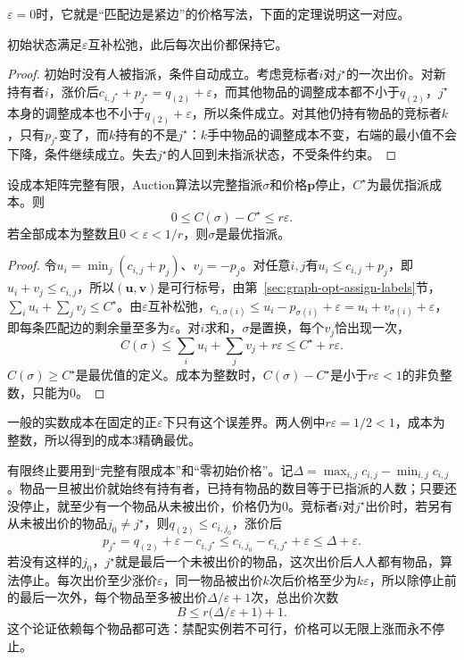 $\varepsilon=0$时，它就是“匹配边是紧边”的价格写法，下面的定理说明这一对应。

\begin{lemma}
初始状态满足$\varepsilon$互补松弛，此后每次出价都保持它。
\end{lemma}

\begin{proof}
初始时没有人被指派，条件自动成立。考虑竞标者$i$对$j^\star$的一次出价。对新持有者$i$，涨价后$c_{i,j^\star}+p_{j^\star}=q_{(2)}+\varepsilon$，而其他物品的调整成本都不小于$q_{(2)}$，$j^\star$本身的调整成本也不小于$q_{(2)}+\varepsilon$，所以条件成立。对其他仍持有物品的竞标者$k$，只有$p_{j^\star}$变了，而$k$持有的不是$j^\star$：$k$手中物品的调整成本不变，右端的最小值不会下降，条件继续成立。失去$j^\star$的人回到未指派状态，不受条件约束。
\end{proof}

\begin{theorem}[Auction算法的误差界]
\label{thm:graph-opt-auction}
设成本矩阵完整有限，Auction算法以完整指派$\sigma$和价格$\bm p$停止，$C^\star$为最优指派成本。则
\[
  0\leq C(\sigma)-C^\star\leq r\varepsilon.
\]
若全部成本为整数且$0<\varepsilon<1/r$，则$\sigma$是最优指派。
\end{theorem}

\begin{proof}
令$u_i=\min_j(c_{i,j}+p_j)$、$v_j=-p_j$。对任意$i,j$有$u_i\leq c_{i,j}+p_j$，即$u_i+v_j\leq c_{i,j}$，所以$(\bm u,\bm v)$是可行标号，由第~\ref{sec:graph-opt-assign-labels}节，$\sum_iu_i+\sum_jv_j\leq C^\star$。由$\varepsilon$互补松弛，$c_{i,\sigma(i)}\leq u_i-p_{\sigma(i)}+\varepsilon=u_i+v_{\sigma(i)}+\varepsilon$，即每条匹配边的剩余量至多为$\varepsilon$。对$i$求和，$\sigma$是置换，每个$v_j$恰出现一次，
\[
  C(\sigma)\leq\sum_iu_i+\sum_jv_j+r\varepsilon\leq C^\star+r\varepsilon.
\]
$C(\sigma)\geq C^\star$是最优值的定义。成本为整数时，$C(\sigma)-C^\star$是小于$r\varepsilon<1$的非负整数，只能为$0$。
\end{proof}

一般的实数成本在固定的正$\varepsilon$下只有这个误差界。两人例中$r\varepsilon=1/2<1$，成本为整数，所以得到的成本$3$精确最优。

有限终止要用到“完整有限成本”和“零初始价格”。记$\Delta=\max_{i,j}c_{i,j}-\min_{i,j}c_{i,j}$。物品一旦被出价就始终有持有者，已持有物品的数目等于已指派的人数；只要还没停止，就至少有一个物品从未被出价，价格仍为$0$。竞标者$i$对$j^\star$出价时，若另有从未被出价的物品$j_0\neq j^\star$，则$q_{(2)}\leq c_{i,j_0}$，涨价后
\[
  p_{j^\star}=q_{(2)}+\varepsilon-c_{i,j^\star}\leq c_{i,j_0}-c_{i,j^\star}+\varepsilon\leq\Delta+\varepsilon.
\]
若没有这样的$j_0$，$j^\star$就是最后一个未被出价的物品，这次出价后人人都有物品，算法停止。每次出价至少涨价$\varepsilon$，同一物品被出价$k$次后价格至少为$k\varepsilon$，所以除停止前的最后一次外，每个物品至多被出价$\Delta/\varepsilon+1$次，总出价次数
\[
  B\leq r\bigl(\Delta/\varepsilon+1\bigr)+1.
\]
这个论证依赖每个物品都可选：禁配实例若不可行，价格可以无限上涨而永不停止。

